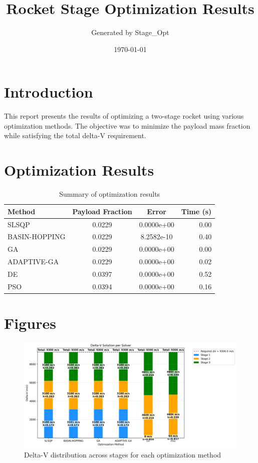 \documentclass{article}
\title{Rocket Stage Optimization Results}
\author{Generated by Stage\_Opt}
\date{\today}
\begin{document}
\maketitle

\section{Introduction}
This report presents the results of optimizing a two-stage rocket using various optimization methods. The objective was to minimize the payload mass fraction while satisfying the total delta-V requirement.

\section{Optimization Results}
\begin{table}[H]
\centering
\begin{tabular}{lccr}
\toprule
Method & Payload Fraction & Error & Time (s) \\
\midrule
SLSQP & 0.0229 & 0.0000e+00 & 0.00 \\
BASIN-HOPPING & 0.0229 & 8.2582e-10 & 0.40 \\
GA & 0.0229 & 0.0000e+00 & 0.00 \\
ADAPTIVE-GA & 0.0229 & 0.0000e+00 & 0.02 \\
DE & 0.0397 & 0.0000e+00 & 0.52 \\
PSO & 0.0394 & 0.0000e+00 & 0.16 \\
\bottomrule
\end{tabular}
\caption{Summary of optimization results}
\label{tab:results}
\end{table}

\section{Figures}
\begin{figure}[H]
\centering
\includegraphics[width=\textwidth]{dv_breakdown.png}
\caption{Delta-V distribution across stages for each optimization method}
\label{fig:dv-breakdown}
\end{figure}
\end{document}
